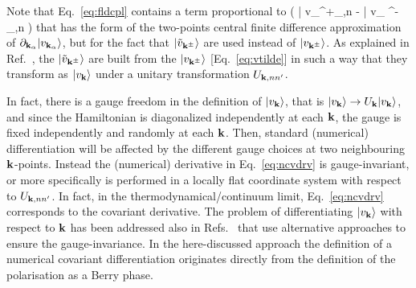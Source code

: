 Note that Eq.~\eqref{eq:fldcpl} contains a term proportional to 
\be
{}\left( | \tilde v_{\kk^{+}_\alpha,n} \rangle - | \tilde v_{ \kk^{-}_\alpha,n} \rangle\right)
\label{eq:ncvdrv}
\ee
that has the form of the two-points central finite difference approximation of $\partial_{{\bf k}_\alpha}|v_{{\bf k}_\alpha}\rangle$, but for the fact that $|\tilde v_{{\bf k}^{\pm}}\rangle$ are used instead of $|v_{{\bf k}^{\pm}}\rangle$. As explained in Ref.~\cite{souza_prb}, the $|\tilde v_{{\bf k}^{\pm}}\rangle$ are built from the $|v_{{\bf k}^{\pm}}\rangle$ [Eq.~\eqref{eq:vtilde}] in such a way that they transform as $|v_{\bf k}\rangle$ under a unitary transformation $U_{{\bf k},nn'}$. 

In fact, there is a gauge freedom in the definition of $|v_{\bf k}\rangle$,  that is $|v_{\bf k}\rangle \rightarrow  U_{{\bf k}} |v_{\bf k}\rangle$, and since the Hamiltonian is diagonalized independently at each ${\bf k}$, the gauge is fixed independently and randomly at each ${\bf k}$. Then, standard (numerical) differentiation will be affected by the different gauge choices at two neighbouring ${\bf k}$-points. Instead the (numerical) derivative in Eq.~\eqref{eq:ncvdrv} is gauge-invariant, or more specifically is performed in a locally flat coordinate system with respect to $U_{{\bf k},nn'}$. In fact, in the thermodynamical/continuum limit, Eq.~\eqref{eq:ncvdrv} corresponds to the covariant derivative. The problem of differentiating $|v_{\bf k}\rangle$  with respect to ${\bf k}$ has been addressed also in Refs.~\cite{PhysRevB.76.035213,springborg,andrew1998computation,korbel2015optical} that use alternative approaches to ensure the gauge-invariance.
In the here-discussed approach the definition of a numerical covariant differentiation originates directly from the definition of the polarisation as a Berry phase. 


